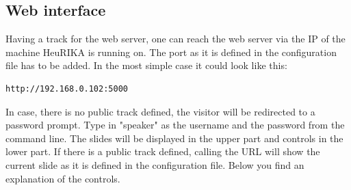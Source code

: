 \subsection{Web interface}
Having a track for the web server, one can reach the web server via the IP of the machine HeuRIKA is running on. 
The port as it is defined in the configuration file has to be added. 
In the most simple case it could look like this:
\begin{verbatim}
http://192.168.0.102:5000
\end{verbatim}

In case, there is no public track defined, the visitor will be redirected to a password prompt.
Type in "speaker" as the username and the password from the command line. 
The slides will be displayed in the upper part and controls in the lower part.
If there is a public track defined, calling the URL will show the current slide as it is defined in the configuration file.
Below you find an explanation of the controls.
\setlength{\tabcolsep}{10pt}
